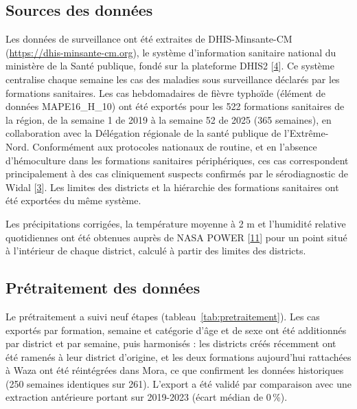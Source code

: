 \documentclass[11pt]{article}
\begin{document}
\subsection{Sources des données}
Les données de surveillance ont été extraites de DHIS-Minsante-CM (\url{https://dhis-minsante-cm.org}), le système d'information sanitaire national du ministère de la Santé publique, fondé sur la plateforme DHIS2 [\hyperlink{ref4}{4}]. Ce système centralise chaque semaine les cas des maladies sous surveillance déclarés par les formations sanitaires. Les cas hebdomadaires de fièvre typhoïde (élément de données MAPE16\_H\_10) ont été exportés pour les 522 formations sanitaires de la région, de la semaine 1 de 2019 à la semaine 52 de 2025 (365 semaines), en collaboration avec la Délégation régionale de la santé publique de l'Extrême-Nord. Conformément aux protocoles nationaux de routine, et en l'absence d'hémoculture dans les formations sanitaires périphériques, ces cas correspondent principalement à des cas cliniquement suspects confirmés par le sérodiagnostic de Widal [\hyperlink{ref3}{3}]. Les limites des districts et la hiérarchie des formations sanitaires ont été exportées du même système.

Les précipitations corrigées, la température moyenne à 2 m et l'humidité relative quotidiennes ont été obtenues auprès de NASA POWER [\hyperlink{ref11}{11}] pour un point situé à l'intérieur de chaque district, calculé à partir des limites des districts.

\subsection{Prétraitement des données}
Le prétraitement a suivi neuf étapes (tableau~\ref{tab:pretraitement}). Les cas exportés par formation, semaine et catégorie d'âge et de sexe ont été additionnés par district et par semaine, puis harmonisés : les districts créés récemment ont été ramenés à leur district d'origine, et les deux formations aujourd'hui rattachées à Waza ont été réintégrées dans Mora, ce que confirment les données historiques (250 semaines identiques sur 261). L'export a été validé par comparaison avec une extraction antérieure portant sur 2019-2023 (écart médian de 0\,\%).
\end{document}
